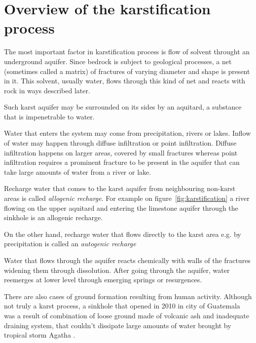 \section{Overview of the karstification process}

The most important factor in karstification process is flow of solvent throught an
underground aquifer. Since bedrock is subject to geological processes, a
net (sometimes called a matrix) of fractures of varying diameter and shape is
present in it. This solvent, usually water, flows through this kind of net and
reacts with rock in ways described later.

Such karst aquifer may be surrounded on its sides by an aquitard, a substance
that is impenetrable to water.

Water that enters the system may come from precipitation, rivers or lakes. Inflow
of water may happen through diffuse infiltration or point infiltration.
Diffuse infiltration happens on larger areas, covered by small fractures whereas
point infiltration requires a prominent fracture to be present in the aquifer
that can take large amounts of water from a river or lake.

Recharge water that comes to the karst aquifer from neighbouring non-karst areas
is called \emph{allogenic recharge}. For example on figure~\ref{fig:karstification}
a river flowing on the upper aquitard and entering the limestone aquifer through
the sinkhole is an allogenic recharge.

On the other hand, recharge water that flows directly to the karst area e.g. by
precipitation is called an \emph{autogenic recharge}

Water that flows through the aquifer reacts chemically with walls of the
fractures widening them through dissolution. After going through the aquifer,
water reemerges at lower level through emerging springs or resurgences.

There are also cases of ground formation resulting from human activity.
Although not truly a karst process, a sinkhole that opened in 2010 in city of
Guatemala was a result of combination of loose ground made of volcanic ash and
inadequate draining system, that couldn't dissipate large amounts of water
brought by tropical storm Agatha \parencite{times2010}.

